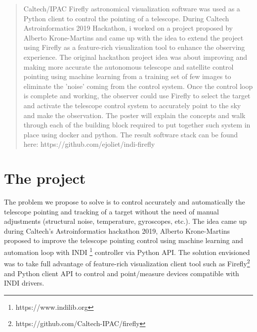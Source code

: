 \documentclass[11pt,twoside]{article}
\begin{document}
\begin{abstract}
Caltech/IPAC Firefly astronomical visualization software was used as a Python client to control the pointing of a telescope.
During Caltech Astroinformatics 2019 Hackathon, i worked on a project proposed by Alberto Krone-Martins and came up with the idea to extend the project using Firefly as a feature-rich visualization tool to enhance the observing experience.
The original hackathon project idea was about improving and making more accurate the autonomous telescope and satellite control pointing using machine learning from a training set of few images to eliminate the 'noise' coming from the control system.
Once the control loop is complete and working, the observer could use Firefly to select the target and activate the telescope control system to accurately point to the sky and make the observation.
The poster will explain the concepts and walk through each of the building block required to put together such system in place using docker and python. The result software stack can be found here: https://github.com/ejoliet/indi-firefly
\end{abstract}




\section{The project}

The problem we propose to solve is to control accurately and automatically the telescope pointing and tracking of a target without the need of manual adjustments (structural noise, temperature, gyroscopes, etc.).
The idea came up during Caltech's Astroinformatics hackathon 2019, Alberto Krone-Martins proposed to improve the telescope pointing control using machine learning and automation loop with INDI \footnote{https://www.indilib.org} controller via Python API.
The solution envisioned was to take full advantage of feature-rich visualization client tool such as Firefly\footnote{https://github.com/Caltech-IPAC/firefly} and Python client API to control and point/measure devices compatible with INDI drivers.
\end{document}
